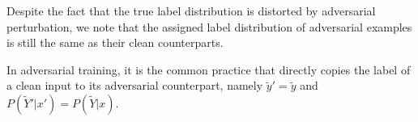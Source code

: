     
     Despite the fact that the true label distribution is distorted by adversarial perturbation, we note that the assigned label distribution of adversarial examples is still the same as their clean counterparts.
    \begin{remark} %
    \label{remark:common-practice}
     In adversarial training, it is the common practice that directly copies the label of a clean input to its adversarial counterpart, namely $\tilde{y}' = \tilde{y}$ and $P(\tilde{Y}'|x') = P(\tilde{Y}|x)$.
    \end{remark}

    
    
    
    
    
